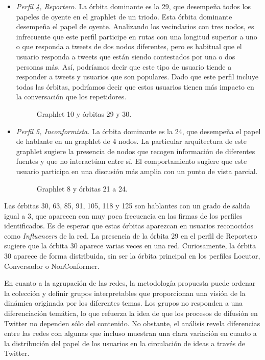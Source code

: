 \begin{itemize}
\item \emph{Perfil 4, Reportero.} La órbita dominante es la 29, que desempeña todos los papeles de oyente en el graphlet de un triodo. Esta órbita dominante desempeña el papel de oyente. Analizando los vecindarios con tres nodos, es infrecuente que este perfil participe en rutas con una longitud superior a uno o que responda a tweets de dos nodos diferentes, pero es habitual que el usuario responda a tweets que están siendo contestados por una o dos personas más. Así, podríamos decir que este tipo de usuario tiende a responder a tweets y usuarios que son populares. Dado que este perfil incluye todas las órbitas, podríamos decir que estos usuarios tienen más impacto en la conversación que los repetidores. \begin{figure}[htbp]
   \centering
   
    \caption{Graphlet 10 y órbitas 29 y 30.}
    \label{img:web-comp}
\end{figure}

\item \emph{Perfil 5, Inconformista.} La órbita dominante es la 24, que desempeña el papel de hablante en un graphlet de 4 nodos. La particular arquitectura de este graphlet sugiere la presencia de nodos que recogen información de diferentes fuentes y que no interactúan entre sí. El comportamiento sugiere que este usuario participa en una discusión más amplia con un punto de vista parcial. \begin{figure}[htbp]
   \centering
   
    \caption{Graphlet 8 y órbitas 21 a 24.}
    \label{img:web-comp}
\end{figure}

\end{itemize}

Las órbitas 30, 63, 85, 91, 105, 118 y 125 son hablantes con un grado de salida igual a 3, que aparecen con muy poca frecuencia en las firmas de los perfiles identificados. Es de esperar que estas órbitas aparezcan en usuarios reconocidos como \textit{Influencers} de la red. La presencia de la órbita 29 en el perfil de Reportero sugiere que la órbita 30 aparece varias veces en una red. Curiosamente, la órbita 30 aparece de forma distribuida, sin ser la órbita principal en los perfiles Locutor, Conversador o NonConformer.

En cuanto a la agrupación de las redes, la metodología propuesta puede ordenar la colección y definir grupos interpretables que proporcionan una visión de la dinámica originada por los diferentes temas. Los grupos no responden a una diferenciación temática, lo que refuerza la idea de que los procesos de difusión en Twitter no dependen sólo del contenido. No obstante, el análisis revela diferencias entre las redes con algunas que incluso muestran una clara variación en cuanto a la distribución del papel de los usuarios en la circulación de ideas a través de Twitter. 

